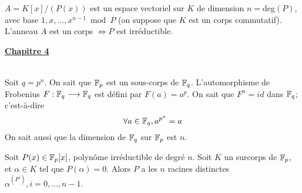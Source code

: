 \documentclass[12pt,a4paper]{article}
\begin{document}
\begin{flushleft}
\begin{prop}
$A = K[x] / (P(x))$ est un espace vectoriel sur $K$ de dimension $n = $deg$(P)$, avec base $1, x, \ldots , x^{n-1} \bmod P$ (on suppose que $K$ est un corps commutatif). L'anneau $A$ est un corps $\Leftrightarrow P$ est irréductible.
\end{prop}

\textbf{\underline{Chapitre 4}}\\~\\

\begin{rem}
Soit $q = p^n$. On sait que $\mathbb{F}_p$ est un sous-corps de $\mathbb{F}_q$. L'automorphisme de Frobenius $F: \mathbb{F}_q \longrightarrow \mathbb{F}_q$ est défini par $F(a) = a^p$. On sait que $F^n = id$ dans $\mathbb{F}_q$; c'est-à-dire $$\forall a \in \mathbb{F}_q , a^{p^n} = a$$ On sait aussi que la dimension de $\mathbb{F}_q$ sur $\mathbb{F}_p$ est $n$. 
\end{rem}

\begin{thm}

\end{thm}

\begin{thm}
Soit $P(x) \in \mathbb{F}_p [x]$, polynôme irréductible de degré $n$. Soit $K$ un surcorps de $\mathbb{F}_p$, et $\alpha \in K$ tel que $P(\alpha) = 0$. Alors $P$ a les $n$ racines distinctes $\alpha^{(P^i)}, i = 0, \ldots , n-1$.
\end{thm}





\end{flushleft}


 
\end{document}
